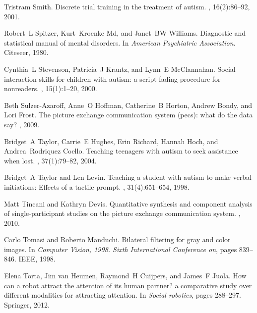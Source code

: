 \documentclass{ut-thesis}
\begin{document}
\begin{thebibliography}{100}
Tristram Smith.
\newblock Discrete trial training in the treatment of autism.
,
  16(2):86--92, 2001.

Robert~L Spitzer, Kurt~Kroenke Md, and Janet~BW Williams.
\newblock Diagnostic and statistical manual of mental disorders.
\newblock In {\em American Psychiatric Association}. Citeseer, 1980.

Cynthia~L Stevenson, Patricia~J Krantz, and Lynn~E McClannahan.
\newblock Social interaction skills for children with autism: a script-fading
  procedure for nonreaders.
, 15(1):1--20, 2000.

Beth Sulzer-Azaroff, Anne~O Hoffman, Catherine~B Horton, Andrew Bondy, and Lori
  Frost.
\newblock The picture exchange communication system (pecs): what do the data
  say?
, 2009.

Bridget~A Taylor, Carrie~E Hughes, Erin Richard, Hannah Hoch, and
  Andrea~Rodriquez Coello.
\newblock Teaching teenagers with autism to seek assistance when lost.
, 37(1):79--82, 2004.

Bridget~A Taylor and Len Levin.
\newblock Teaching a student with autism to make verbal initiations: Effects of
  a tactile prompt.
, 31(4):651--654, 1998.

Matt Tincani and Kathryn Devis.
\newblock Quantitative synthesis and component analysis of single-participant
  studies on the picture exchange communication system.
, 2010.

Carlo Tomasi and Roberto Manduchi.
\newblock Bilateral filtering for gray and color images.
\newblock In {\em Computer Vision, 1998. Sixth International Conference on},
  pages 839--846. IEEE, 1998.

Elena Torta, Jim van Heumen, Raymond~H Cuijpers, and James~F Juola.
\newblock How can a robot attract the attention of its human partner? a
  comparative study over different modalities for attracting attention.
\newblock In {\em Social robotics}, pages 288--297. Springer, 2012.


\end{thebibliography}
\end{document}
